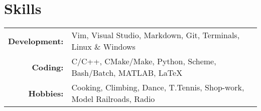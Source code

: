 \section*{\color{Blue}Skills\vspace{0.5mm}{\color{Orange}\hrule}}

\begin{tabular}{ r | l }
\textbf{Development:}   &Vim, Visual Studio, Markdown, Git, Terminals, Linux \& Windows\\
\textbf{Coding:}        &C/C++, CMake/Make, Python, Scheme, Bash/Batch, MATLAB, \LaTeX\\
\textbf{Hobbies:}       &Cooking, Climbing, Dance, T.Tennis, Shop-work, Model Railroads, Radio
\end{tabular}
